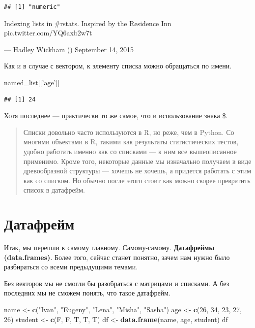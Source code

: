 \documentclass[]{book}
\newenvironment{Shaded}{\begin{snugshade}}{\end{snugshade}}
\newcommand{\KeywordTok}[1]{\textcolor[rgb]{0.13,0.29,0.53}{\textbf{#1}}}
\newcommand{\DecValTok}[1]{\textcolor[rgb]{0.00,0.00,0.81}{#1}}
\newcommand{\StringTok}[1]{\textcolor[rgb]{0.31,0.60,0.02}{#1}}
\newcommand{\NormalTok}[1]{#1}
\begin{document}
\begin{verbatim}
## [1] "numeric"
\end{verbatim}

Indexing lists in \#rstats. Inspired by the Residence Inn
pic.twitter.com/YQ6axb2w7t

--- Hadley Wickham (\citet{hadleywickham}) September 14, 2015

Как и в случае с вектором, к элементу списка можно обращаться по имени.

\begin{Shaded}
\begin{Highlighting}[]
\NormalTok{named_list[[}\StringTok{'age'}\NormalTok{]]}
\end{Highlighting}
\end{Shaded}

\begin{verbatim}
## [1] 24
\end{verbatim}

Хотя последнее --- практически то же самое, что и использование знака
\$.

\begin{quote}
Списки довольно часто используются в R, но реже, чем в Python. Со
многими объектами в R, такими как результаты статистических тестов,
удобно работать именно как со списками --- к ним все вышеописанное
применимо. Кроме того, некоторые данные мы изначально получаем в виде
древообразной структуры --- хочешь не хочешь, а придется работать с этим
как со списком. Но обычно после этого стоит как можно скорее превратить
список в датафрейм.
\end{quote}

\section{Датафрейм}\label{df}

Итак, мы перешли к самому главному. Самому-самому. \textbf{Датафреймы
(data.frames)}. Более того, сейчас станет понятно, зачем нам нужно было
разбираться со всеми предыдущими темами.

Без векторов мы не смогли бы разобраться с матрицами и списками. А без
последних мы не сможем понять, что такое датафрейм.

\begin{Shaded}
\begin{Highlighting}[]
\NormalTok{name <-}\StringTok{ }\KeywordTok{c}\NormalTok{(}\StringTok{"Ivan"}\NormalTok{, }\StringTok{"Eugeny"}\NormalTok{, }\StringTok{"Lena"}\NormalTok{, }\StringTok{"Misha"}\NormalTok{, }\StringTok{"Sasha"}\NormalTok{) }
\NormalTok{age <-}\StringTok{ }\KeywordTok{c}\NormalTok{(}\DecValTok{26}\NormalTok{, }\DecValTok{34}\NormalTok{, }\DecValTok{23}\NormalTok{, }\DecValTok{27}\NormalTok{, }\DecValTok{26}\NormalTok{) }
\NormalTok{student <-}\StringTok{ }\KeywordTok{c}\NormalTok{(F, F, T, T, T) }
\NormalTok{df <-}\StringTok{ }\KeywordTok{data.frame}\NormalTok{(name, age, student)  }
\NormalTok{df}
\end{Highlighting}
\end{Shaded}
\end{document}

